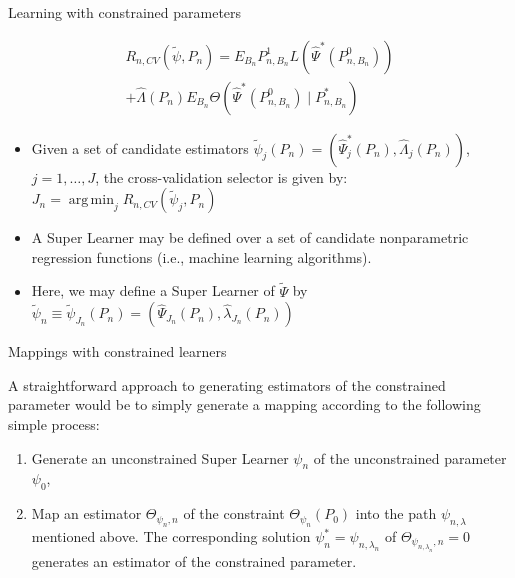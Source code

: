 \documentclass[12pt,t,handout]{beamer}
\DeclareMathOperator*{\argmin}{arg\,min}
\begin{document}
\begin{frame}[c]{Learning with constrained parameters}

\begin{center}
\begin{equation}
\begin{split}
  R_{n, CV}(\tilde{\psi}, P_n) = E_{B_n}P_{n, B_n}^1L(\hat{\Psi}^*(P_{n,
    B_n}^0)) \\ + \hat{\Lambda}(P_n) E_{B_n} \Theta(\hat{\Psi}^*(P_{n, B_n}^0)
    \mid P_{n, B_n}^*)
\end{split}
\end{equation}
\begin{itemize}
  \itemsep12pt
  \item Given a set of candidate estimators $\widetilde{\psi}_j(P_n) =
    (\hat{\Psi}_j^*(P_n), \hat{\Lambda}_j(P_n))$, $j = 1, \ldots, J$, the
    cross-validation selector is given by: $J_n = \argmin_j R_{n,
      CV}(\widetilde{\psi}_j, P_n)$
  \item A Super Learner may be defined over a set of candidate nonparametric
    regression functions (i.e., machine learning algorithms).
  \item Here, we may define a Super Learner of $\widetilde{\Psi}$ by
    $\widetilde{\psi}_n \equiv \widetilde{\psi}_{J_n}(P_n) =
    (\hat{\Psi}_{J_n}(P_n), \hat{\lambda}_{J_n}(P_n))$
\end{itemize}
\end{center}

\note{
}

\end{frame}


\begin{frame}[c]{Mappings with constrained learners}

\begin{center}
A straightforward approach to generating estimators of the constrained parameter
would be to simply generate a mapping according to the following simple process:

\vspace*{1em}

\begin{enumerate}
  \itemsep12pt
  \item Generate an unconstrained Super Learner $\psi_n$ of the unconstrained
    parameter $\psi_0$,
  \item Map an estimator $\Theta_{\psi_n, n}$ of the constraint
    $\Theta_{\psi_n}(P_0)$ into the path $\psi_{n, \lambda}$ mentioned above.
    The corresponding solution $\psi_n^* = \psi_{n, \lambda_n}$ of
    $\Theta_{\psi_{n, \lambda_n}, n}= 0$ generates an estimator of the
    constrained parameter.
\end{enumerate}
\end{center}

\note{
}

\end{frame}
\end{document}
